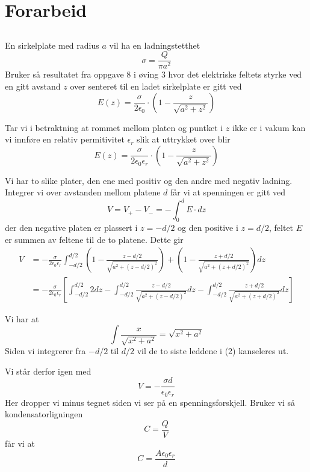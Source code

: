\documentclass[a4paper,11pt,norsk]{article}
\begin{document}


\section{Forarbeid}
\subsection{}
En sirkelplate med radius $a$ vil ha en ladningstetthet
\[
    \sigma = \frac{Q}{\pi a^2}
\]
Bruker så resultatet fra oppgave 8 i øving 3 hvor det elektriske feltets styrke ved en gitt avstand 
$z$ over senteret til en ladet sirkelplate er gitt ved 
\[
    E(z) = \frac{\sigma}{2\epsilon_0} \cdot \left(1 - \frac{z}{\sqrt{a^2 + z^2}}\right)
\]

Tar vi i betraktning at rommet mellom platen og puntket i $z$ ikke er i vakum kan vi innføre en relativ permitivitet 
$\epsilon_r$ slik at uttrykket over blir
\[
    E(z) = \frac{\sigma}{2\epsilon_0\epsilon_r} \cdot \left(1 - \frac{z}{\sqrt{a^2 + z^2}}\right)
\]

Vi har to slike plater, den ene med positiv og den andre med negativ ladning. Integrer vi over avstanden 
mellom platene $d$ får vi at spenningen er gitt ved
\[
    V = V_+ - V_- = -\int_{0}^{d}E \cdot dz
\]
der den negative platen er plassert i $z = -d/2$ og den positive i $z = d/2$, feltet $E$ er summen av feltene 
til de to platene. Dette gir
\begin{align}
    V &= -\frac{\sigma}{2\epsilon_0\epsilon_r}\int_{-d/2}^{d/2}{\left(1 - \frac{z - d/2}{\sqrt{a^2 + (z - d/2)^2}}\right) + \left(1 - \frac{z + d/2}{\sqrt{a^2 + (z + d/2)^2}}\right) dz} \\
      &= -\frac{\sigma}{2\epsilon_0\epsilon_r}\left[\int_{-d/2}^{d/2}{2 dz} - \int_{-d/2}^{d/2}{\frac{z - d/2}{\sqrt{a^2 + (z - d/2)^2}}dz} - \int_{-d/2}^{d/2}{\frac{z + d/2}{\sqrt{a^2 + (z + d/2)^2}}dz}\right]
\end{align}

Vi har at 
\[
    \int \frac{x}{\sqrt{x^2 + a^2}} = \sqrt{x^2 + a^2}
\]
Siden vi integrerer fra $-d/2$ til $d/2$ vil de to siste leddene i (2) kanseleres ut.

\newpage
Vi står derfor igen med
\[
    V = -\frac{\sigma d}{\epsilon_0 \epsilon_r}
\]
Her dropper vi minus tegnet siden vi ser på en spenningsforskjell. Bruker vi så kondensatorligningen 
\[
    C = \frac{Q}{V}
\]
får vi at 
\[
    \boxed{C = \frac{A\epsilon_0\epsilon_r}{d}}
\]
\end{document}
